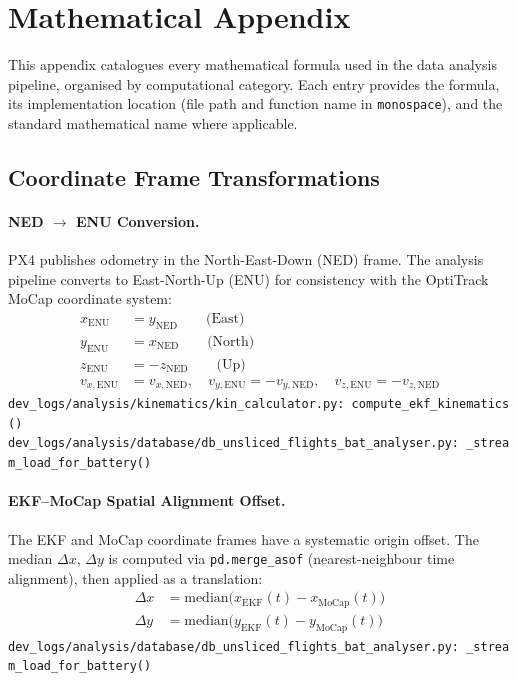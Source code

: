 \clearpage
\section{Mathematical Appendix}
\label{sec:math_appendix}

This appendix catalogues every mathematical formula used in the data analysis pipeline, organised by computational category. Each entry provides the formula, its implementation location (file path and function name in \texttt{monospace}), and the standard mathematical name where applicable.

\subsection{Coordinate Frame Transformations}

\paragraph{NED $\to$ ENU Conversion.}
PX4 publishes odometry in the North-East-Down (NED) frame. The analysis pipeline converts to East-North-Up (ENU) for consistency with the OptiTrack MoCap coordinate system:
\begin{align}
    x_{\text{ENU}} &=  y_{\text{NED}} \qquad\text{(East)}  \\
    y_{\text{ENU}} &=  x_{\text{NED}} \qquad\text{(North)} \\
    z_{\text{ENU}} &= -z_{\text{NED}} \qquad\text{(Up)}    \\
    v_{x,\text{ENU}} &=  v_{x,\text{NED}},\quad
    v_{y,\text{ENU}} = -v_{y,\text{NED}},\quad
    v_{z,\text{ENU}} = -v_{z,\text{NED}} \nonumber
\end{align}
\texttt{\small dev\_logs/analysis/kinematics/kin\_calculator.py:\ compute\_ekf\_kinematics()}\\
\texttt{\small dev\_logs/analysis/database/db\_unsliced\_flights\_bat\_analyser.py:\ \_stream\_load\_for\_battery()}

\medskip
\paragraph{EKF--MoCap Spatial Alignment Offset.}
The EKF and MoCap coordinate frames have a systematic origin offset. The median $\Delta x$, $\Delta y$ is computed via \texttt{pd.merge\_asof} (nearest-neighbour time alignment), then applied as a translation:
\begin{align}
    \Delta x &= \mathrm{median}\bigl(x_{\text{EKF}}(t) - x_{\text{MoCap}}(t)\bigr) \\
    \Delta y &= \mathrm{median}\bigl(y_{\text{EKF}}(t) - y_{\text{MoCap}}(t)\bigr) \nonumber
\end{align}
\texttt{\small dev\_logs/analysis/database/db\_unsliced\_flights\_bat\_analyser.py:\ \_stream\_load\_for\_battery()}

